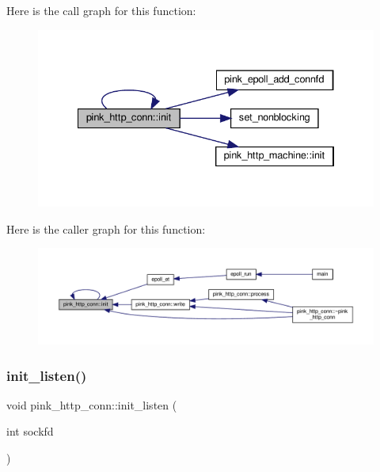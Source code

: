 Here is the call graph for this function\+:
\nopagebreak
\begin{figure}[H]
\begin{center}
\leavevmode
\includegraphics[width=334pt]{classpink__http__conn_abff27697496d209cdc7375f99117f018_cgraph}
\end{center}
\end{figure}
Here is the caller graph for this function\+:
\nopagebreak
\begin{figure}[H]
\begin{center}
\leavevmode
\includegraphics[width=350pt]{classpink__http__conn_abff27697496d209cdc7375f99117f018_icgraph}
\end{center}
\end{figure}
\mbox{\label{classpink__http__conn_a14ed30d2643f52ec95c45b11b13b2411}} 
\subsubsection{\texorpdfstring{init\+\_\+listen()}{init\_listen()}}
{\footnotesize\ttfamily void pink\+\_\+http\+\_\+conn\+::init\+\_\+listen (\begin{DoxyParamCaption}\item[{int}]{sockfd }\end{DoxyParamCaption})}



